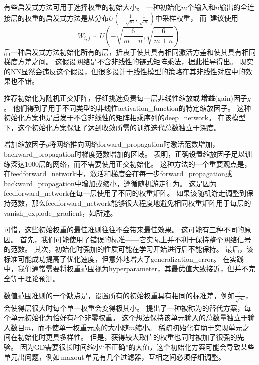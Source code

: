 有些启发式方法可用于选择权重的初始大小。
一种初始化$m$个输入和$n$输出的全连接层的权重的启发式方法是从分布$U(-\frac{1}{\sqrt{m}}, \frac{1}{\sqrt{m}})$中采样权重，
而~\citet{GlorotAISTATS2010-small}建议使用
\begin{equation}
    W_{i,j} \sim U \left(-\sqrt{\frac{6}{m+n}}, \sqrt{\frac{6}{m+n}}\right) .
\end{equation}
后一种启发式方法初始化所有的层，折衷于使其具有相同激活方差和使其具有相同梯度方差之间。
这假设网络是不含非线性的链式矩阵乘法，据此推导得出。
现实的\gls{NN}显然会违反这个假设，但很多设计于线性模型的策略在其非线性对应中的效果也不错。


\cite{Saxe-et-al-ICLR13}推荐初始化为随机正交矩阵，仔细挑选负责每一层非线性缩放或\,\textbf{增益}(gain)因子$g$。
他们得到了用于不同类型的非线性\gls{activation_function}的特定缩放因子。
这种初始化方案也是启发于不含非线性的矩阵相乘序列的\gls{deep_network}。
在该模型下，这个初始化方案保证了达到收敛所需的训练迭代总数独立于深度。


增加缩放因子$g$将网络推向网络\gls{forward_propagation}时激活范数增加，\gls{backward_propagation}时梯度范数增加的区域。
\cite{Sussillo14}表明，正确设置缩放因子足以训练深达$1000$层的网络，而不需要使用正交初始化。
这种方法的一个重要观点是，在\gls{feedforward_network}中，激活和梯度会在每一步\gls{forward_propagation}或\gls{backward_propagation}中增加或缩小，遵循随机游走行为。
这是因为\gls{feedforward_network}在每一层使用了不同的权重矩阵。
如果该随机游走调整到保持范数，那么\gls{feedforward_network}能够很大程度地避免相同权重矩阵用于每层的\gls{vanish_explode_gradient}，如所述。


可惜，这些初始权重的最佳准则往往不会带来最佳效果。
这可能有三种不同的原因。
首先，我们可能使用了错误的标准——它实际上并不利于保持整个网络信号的范数。
其次，初始化时强加的性质可能在学习开始进行后不能保持。
最后，该标准可能成功提高了优化速度，但意外地增大了\gls{generalization_error}。
在实践中，我们通常需要将权重范围视为\gls{hyperparameter}，其最优值大致接近，但并不完全等于理论预测。


数值范围准则的一个缺点是，设置所有的初始权重具有相同的标准差，例如$\frac{1}{\sqrt{m}}$，会使得层很大时每个单一权重会变得极其小。
\cite{martens2010hessian-small}提出了一种被称为的替代方案，每个单元初始化为恰好有$k$个非零权重。
这个想法保持该单元输入的总数量独立于输入数目$m$，而不使单一权重元素的大小随$m$缩小。
稀疏初始化有助于实现单元之间在初始化时更具多样性。
但是，获得较大取值的权重也同时被加了很强的先验。
因为\gls{GD}需要很长时间缩小``不正确''的大值，这个初始化方案可能会导致某些单元出问题，例如\,\gls{maxout}\,单元有几个过滤器，互相之间必须仔细调整。


